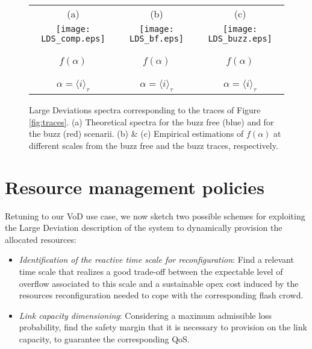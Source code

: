 \documentclass[twoside]{article}
\begin{document}
\begin{figure}[t]
\begin{center}
\begin{tabular}{ccc}
{\normalsize (a)} & \hspace*{-8mm} {\normalsize (b)} & \hspace*{-8mm} {\normalsize (c)} \\
\hspace*{-10mm}\texttt{[image: LDS\_comp.eps]}
&
\hspace*{-0mm}\texttt{[image: LDS\_bf.eps]} 
&
\hspace*{-0mm}\texttt{[image: LDS\_buzz.eps]}\\[-26mm]
\hspace*{-72mm}\begin{turn}{90}$f(\alpha)$\end{turn} 
& 
\hspace*{-56mm}\begin{turn}{90}$f(\alpha)$\end{turn} 
&
\hspace*{-56mm}\begin{turn}{90}$f(\alpha)$\end{turn}  \\[20mm]
$\alpha = \langle i \rangle_{\tau}$ & $\alpha = \langle i \rangle_{\tau}$ & $\alpha = \langle i \rangle_{\tau}$  \\
\end{tabular}
\end{center}
\caption{\small Large Deviations spectra corresponding to the traces of Figure \ref{fig:traces}. (a) Theoretical spectra for the buzz free (blue) and for the buzz (red) scenarii. (b) \& (c) Empirical estimations of $f(\alpha)$ at different scales from the buzz free and the buzz traces, respectively. }
\label{fig:LDP}
\end{figure}

\newpage

\section{Resource management policies}
\label{sec:management}
Retuning to our VoD use case, we now sketch two possible schemes for exploiting the Large Deviation description of the system to dynamically provision the allocated resources:

\begin{itemize}
\item {\it Identification of the reactive time scale for reconfiguration}: Find a relevant time scale that realizes a good trade-off between the expectable level of overflow associated to this scale and a sustainable {\sc opex} cost induced by the resources reconfiguration needed to cope with the corresponding flash crowd.
\item {\it Link capacity dimensioning}: Considering a maximum admissible loss probability, find the  safety margin  that it is necessary to provision on the link capacity, to guarantee the corresponding QoS. 
\end{itemize}
\end{document}
